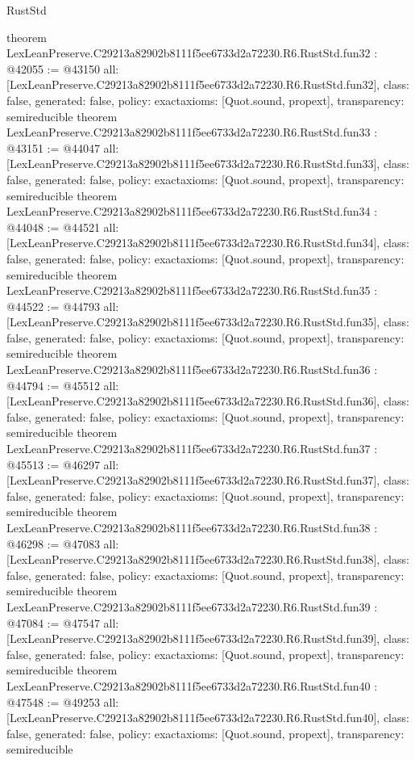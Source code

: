 \begin{lexlean}{RustStd}
\begin{coremodule}
{}
theorem LexLeanPreserve.C29213a82902b8111f5ee6733d2a72230.R6.RustStd.fun32 : @42055 := @43150 {
  all: [LexLeanPreserve.C29213a82902b8111f5ee6733d2a72230.R6.RustStd.fun32],
  class: false,
  generated: false,
  policy: exact{axioms: [Quot.sound, propext]},
  transparency: semireducible
}
theorem LexLeanPreserve.C29213a82902b8111f5ee6733d2a72230.R6.RustStd.fun33 : @43151 := @44047 {
  all: [LexLeanPreserve.C29213a82902b8111f5ee6733d2a72230.R6.RustStd.fun33],
  class: false,
  generated: false,
  policy: exact{axioms: [Quot.sound, propext]},
  transparency: semireducible
}
theorem LexLeanPreserve.C29213a82902b8111f5ee6733d2a72230.R6.RustStd.fun34 : @44048 := @44521 {
  all: [LexLeanPreserve.C29213a82902b8111f5ee6733d2a72230.R6.RustStd.fun34],
  class: false,
  generated: false,
  policy: exact{axioms: [Quot.sound, propext]},
  transparency: semireducible
}
theorem LexLeanPreserve.C29213a82902b8111f5ee6733d2a72230.R6.RustStd.fun35 : @44522 := @44793 {
  all: [LexLeanPreserve.C29213a82902b8111f5ee6733d2a72230.R6.RustStd.fun35],
  class: false,
  generated: false,
  policy: exact{axioms: [Quot.sound, propext]},
  transparency: semireducible
}
theorem LexLeanPreserve.C29213a82902b8111f5ee6733d2a72230.R6.RustStd.fun36 : @44794 := @45512 {
  all: [LexLeanPreserve.C29213a82902b8111f5ee6733d2a72230.R6.RustStd.fun36],
  class: false,
  generated: false,
  policy: exact{axioms: [Quot.sound, propext]},
  transparency: semireducible
}
theorem LexLeanPreserve.C29213a82902b8111f5ee6733d2a72230.R6.RustStd.fun37 : @45513 := @46297 {
  all: [LexLeanPreserve.C29213a82902b8111f5ee6733d2a72230.R6.RustStd.fun37],
  class: false,
  generated: false,
  policy: exact{axioms: [Quot.sound, propext]},
  transparency: semireducible
}
theorem LexLeanPreserve.C29213a82902b8111f5ee6733d2a72230.R6.RustStd.fun38 : @46298 := @47083 {
  all: [LexLeanPreserve.C29213a82902b8111f5ee6733d2a72230.R6.RustStd.fun38],
  class: false,
  generated: false,
  policy: exact{axioms: [Quot.sound, propext]},
  transparency: semireducible
}
theorem LexLeanPreserve.C29213a82902b8111f5ee6733d2a72230.R6.RustStd.fun39 : @47084 := @47547 {
  all: [LexLeanPreserve.C29213a82902b8111f5ee6733d2a72230.R6.RustStd.fun39],
  class: false,
  generated: false,
  policy: exact{axioms: [Quot.sound, propext]},
  transparency: semireducible
}
theorem LexLeanPreserve.C29213a82902b8111f5ee6733d2a72230.R6.RustStd.fun40 : @47548 := @49253 {
  all: [LexLeanPreserve.C29213a82902b8111f5ee6733d2a72230.R6.RustStd.fun40],
  class: false,
  generated: false,
  policy: exact{axioms: [Quot.sound, propext]},
  transparency: semireducible
}
\end{coremodule}
\end{lexlean}
